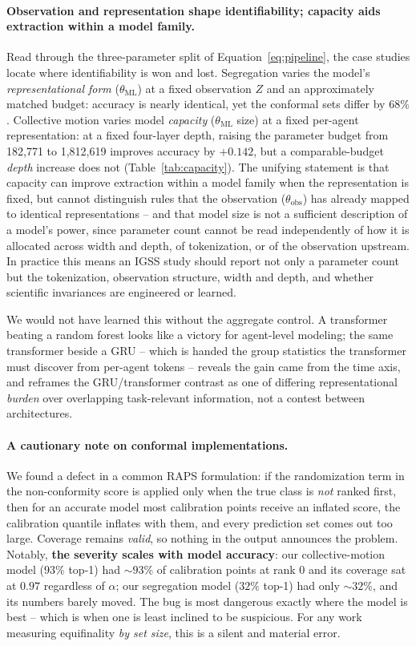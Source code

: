 \documentclass[11pt]{article}
\begin{document}
\paragraph{Observation and representation shape identifiability; capacity aids
extraction within a model family.} Read through the three-parameter split of
Equation~\ref{eq:pipeline}, the case studies locate where identifiability is won and
lost. Segregation varies the model's \emph{representational form} ($\theta_{\mathrm{ML}}$)
at a fixed observation $Z$ and an approximately matched budget: accuracy is nearly
identical, yet the conformal sets differ by $68\%$. Collective motion varies model
\emph{capacity} ($\theta_{\mathrm{ML}}$ size) at a fixed per-agent representation: at a
fixed four-layer depth, raising the parameter budget from 182{,}771 to 1{,}812{,}619
improves accuracy by $+0.142$, but a comparable-budget \emph{depth} increase does not
(Table~\ref{tab:capacity}). The unifying statement is that capacity can improve
extraction within a model family when the representation is fixed, but cannot
distinguish rules that the observation ($\theta_{\mathrm{obs}}$) has already mapped to
identical representations -- and that model size is not a sufficient description of a
model's power, since parameter count cannot be read independently of how it is
allocated across width and depth, of tokenization, or of the observation upstream. In
practice this means an IGSS study should report not only a parameter count but the
tokenization, observation structure, width and depth, and whether scientific
invariances are engineered or learned.

We would not have learned this without the aggregate control. A transformer beating a
random forest looks like a victory for agent-level modeling; the same transformer
beside a GRU -- which is handed the group statistics the transformer must discover from
per-agent tokens -- reveals the gain came from the time axis, and reframes the
GRU/transformer contrast as one of differing representational \emph{burden} over
overlapping task-relevant information, not a contest between architectures.

\paragraph{A cautionary note on conformal implementations.}
We found a defect in a common RAPS formulation: if the randomization term in the
non-conformity score is applied only when the true class is \emph{not} ranked first,
then for an accurate model most calibration points receive an inflated score, the
calibration quantile inflates with them, and every prediction set comes out too large.
Coverage remains \emph{valid}, so nothing in the output announces the problem. Notably,
\textbf{the severity scales with model accuracy}: our collective-motion model ($93\%$
top-1) had ${\sim}93\%$ of calibration points at rank 0 and its coverage sat at $0.97$
regardless of $\alpha$; our segregation model ($32\%$ top-1) had only ${\sim}32\%$, and
its numbers barely moved. The bug is most dangerous exactly where the model is best --
which is when one is least inclined to be suspicious. For any work measuring
equifinality \emph{by set size}, this is a silent and material error.
\end{document}
